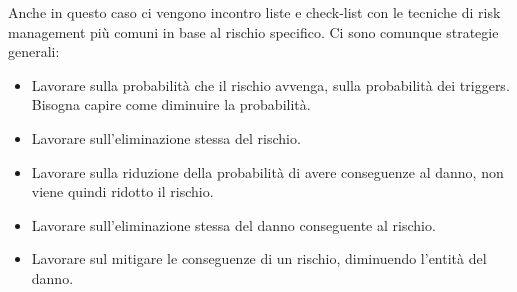 Anche in questo caso ci vengono incontro liste e check-list con le tecniche di risk management più comuni in base al rischio specifico. Ci sono comunque strategie generali:
\begin{itemize}
    \item Lavorare sulla probabilità che il rischio avvenga, sulla probabilità dei triggers. Bisogna capire come diminuire la probabilità.
    \item Lavorare sull'eliminazione stessa del rischio.
    \item Lavorare sulla riduzione della probabilità di avere conseguenze al danno, non viene quindi ridotto il rischio.
    \item Lavorare sull'eliminazione stessa del danno conseguente al rischio.
    \item Lavorare sul mitigare le conseguenze di un rischio, diminuendo l'entità del danno.
\end{itemize}

